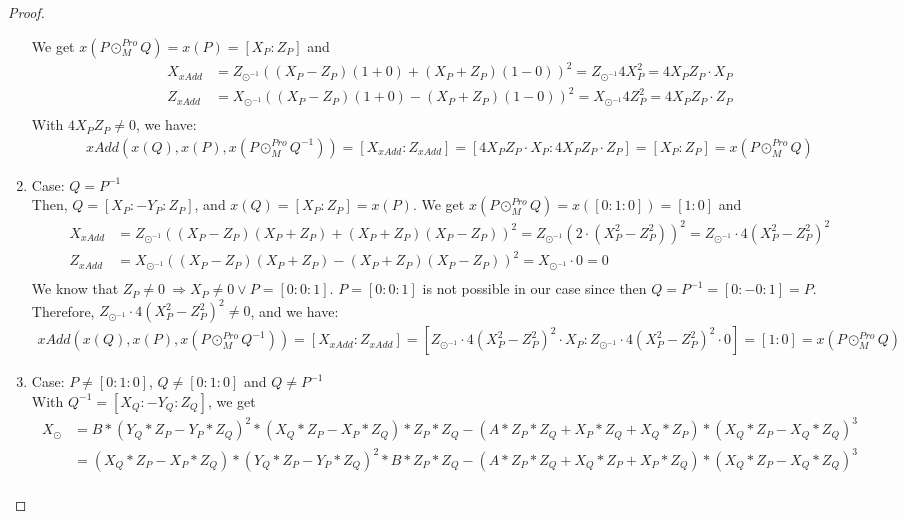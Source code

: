 \begin{proof}
\begin{enumerate}
        We get $x(P\odot_M^{Pro} Q)=x(P)=[X_P:Z_P]$ and
        \begin{align*}
            X_{xAdd} &= Z_{\odot^{-1}}\left((X_P-Z_P)(1+0) + (X_P+Z_P)(1-0)\right)^2= Z_{\odot^{-1}}4X_P^2 = 4X_PZ_P\cdot X_P\\
            Z_{xAdd} &= X_{\odot^{-1}}\left((X_P-Z_P)(1+0) - (X_P+Z_P)(1-0)\right)^2= X_{\odot^{-1}}4Z_P^2 = 4X_PZ_P\cdot Z_P\\
        \end{align*}
        With $4X_PZ_P\neq 0$, we have:
        \begin{align*}
            xAdd(x(Q), x(P), x(P\odot_M^{Pro} Q^{-1})) = [X_{xAdd}:Z_{xAdd}] = [4X_PZ_P\cdot X_P: 4X_PZ_P\cdot Z_P] = [X_P:Z_P] = x(P\odot_M^{Pro} Q)
        \end{align*}
        \item Case: $Q=P^{-1}$\\
        Then, $Q=[X_P:-Y_P:Z_P]$, and $x(Q)=[X_P:Z_P]=x(P)$.
        We get $x(P\odot_M^{Pro} Q)=x([0:1:0])=[1:0]$ and
        \begin{align*}
            X_{xAdd} &= Z_{\odot^{-1}}\left((X_P-Z_P)(X_P+Z_P) + (X_P+Z_P)(X_P-Z_P)\right)^2= Z_{\odot^{-1}}(2\cdot (X_P^2-Z_P^2))^2 = Z_{\odot^{-1}}\cdot 4(X_P^2-Z_P^2)^2\\
            Z_{xAdd} &= X_{\odot^{-1}}\left((X_P-Z_P)(X_P+Z_P) - (X_P+Z_P)(X_P-Z_P)\right)^2= X_{\odot^{-1}}\cdot 0 = 0\\
        \end{align*}
        We know that $Z_P\neq 0 \:\Rightarrow X_P\neq 0 \lor P=[0:0:1]$.
        $P=[0:0:1]$ is not possible in our case since then $Q=P^{-1}=[0:-0:1]=P$. 
        Therefore, $Z_{\odot^{-1}}\cdot 4(X_P^2-Z_P^2)^2\neq 0$, and we have:
        \begin{align*}
            xAdd(x(Q), x(P), x(P\odot_M^{Pro} Q^{-1})) = [X_{xAdd}:Z_{xAdd}] = [Z_{\odot^{-1}}\cdot 4(X_P^2-Z_P^2)^2\cdot X_P: Z_{\odot^{-1}}\cdot 4(X_P^2-Z_P^2)^2\cdot 0] = [1:0] = x(P\odot_M^{Pro} Q)
        \end{align*}
        \item Case: $P\neq [0:1:0]$, $Q\neq[0:1:0]$ and $Q\neq P^{-1}$\\
        With $Q^{-1}=[X_Q:-Y_Q:Z_Q]$, we get
        \begin{align*}
            X_\odot &= B*(Y_Q*Z_P-Y_P*Z_Q)^2*(X_Q*Z_P-X_P*Z_Q)*Z_P*Z_Q-(A*Z_P*Z_Q+X_P*Z_Q+X_Q*Z_P)*(X_Q*Z_P-X_Q*Z_Q)^3\\
            &= (X_Q*Z_P - X_P*Z_Q)*(Y_Q*Z_P - Y_P*Z_Q)^2*B*Z_P*Z_Q - (A*Z_P*Z_Q + X_Q*Z_P + X_P*Z_Q)*(X_Q*Z_P - X_Q*Z_Q)^3\\

\end{align*}
\end{enumerate}
\end{proof}
